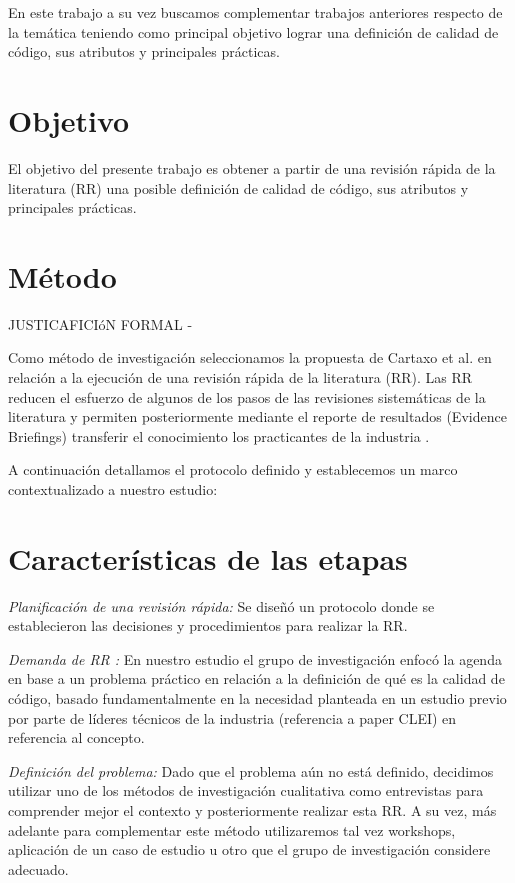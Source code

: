 \documentclass[conference]{IEEEtran}
\begin{document}
 En este trabajo a su vez buscamos complementar trabajos anteriores respecto de la temática \cite{adorjan2020code} teniendo como principal objetivo lograr una definición de calidad de código, sus atributos y principales prácticas.

\section{Objetivo}
El objetivo del presente trabajo es obtener a partir de una revisión rápida de la literatura (RR) \cite{cartaxo2019software}\cite{cartaxo2020rapid}  una posible definición de calidad de código, sus atributos y principales prácticas.

\section{Método}

JUSTICAFICIóN FORMAL - 

Como método de investigación seleccionamos la propuesta de Cartaxo et al. \cite{cartaxo2020rapid} en relación a la ejecución de una revisión rápida de la literatura (RR). Las RR reducen el esfuerzo de algunos de los pasos de las revisiones sistemáticas de la literatura y permiten posteriormente  mediante el reporte de  resultados (Evidence Briefings) transferir el conocimiento los practicantes de la industria \cite{cartaxo2016evidence}. 


A continuación detallamos el protocolo definido y establecemos un marco contextualizado a nuestro estudio: 

\section{Características de las etapas}

  \textit{Planificación de una revisión rápida:}   Se diseñó un protocolo donde se establecieron  las decisiones y procedimientos para realizar la RR. 

\textit{ Demanda de RR :}  En nuestro estudio el grupo de investigación enfocó la agenda en base a un problema práctico en relación a la definición de qué es la calidad de código, basado fundamentalmente en la necesidad planteada en un estudio previo por parte de líderes técnicos de la industria (referencia a paper CLEI) en referencia al concepto. 

\textit{Definición del problema: } Dado que el problema aún no está  definido, decidimos  utilizar uno de los métodos de investigación cualitativa como entrevistas para comprender mejor el contexto y posteriormente realizar esta RR. A su vez, más adelante para complementar este método utilizaremos tal vez workshops,  aplicación de un caso de estudio u otro que el grupo de investigación considere adecuado.
\end{document}
